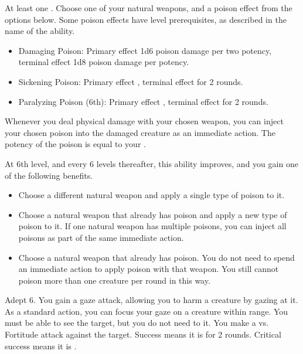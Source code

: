     \featpre At least one .
     Choose one of your natural weapons, and a poison effect from the options below.
    Some poison effects have level prerequisites, as described in the name of the ability.
    \begin{itemize}
        \item Damaging Poison: Primary effect 1d6 poison damage per two potency, terminal effect 1d8 poison damage per potency.
        \item Sickening Poison: Primary effect \sickened, terminal effect \nauseated for 2 rounds.
        \item Paralyzing Poison (6th): Primary effect \immobilized, terminal effect \paralyzed for 2 rounds.
    \end{itemize}
    \featben Whenever you deal physical damage with your chosen weapon, you can inject your chosen poison into the damaged creature as an immediate action.
    The potency of the poison is equal to your .

    At 6th level, and every 6 levels thereafter, this ability improves, and you gain one of the following benefits.
    \begin{itemize}
        \item Choose a different natural weapon and apply a single type of poison to it.
        \item Choose a natural weapon that already has poison and apply a new type of poison to it.
            If one natural weapon has multiple poisons, you can inject all poisons as part of the same immediate action.
        \item Choose a natural weapon that already has poison.
            You do not need to spend an immediate action to apply poison with that weapon.
            You still cannot poison more than one creature per round in this way.
    \end{itemize}

    \featpre Adept 6.
    \featben You gain a gaze attack, allowing you to harm a creature by gazing at it.
    As a standard action, you can focus your gaze on a creature within \rngclose range.
    You must be able to see the target, but you do not need  to it.
    You make a  vs. Fortitude attack against the target.
    Success means it is \slowed for 2 rounds.
    Critical success means it is \petrified.

